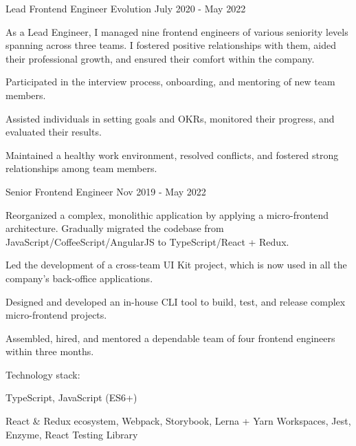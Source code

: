 \begin{cventries}
  \cventry
    {Lead Frontend Engineer} %
    {Evolution} %
    {} %
    {July 2020 - May 2022} %
    {
      As a Lead Engineer, I managed nine frontend engineers of various seniority levels spanning across three teams. I fostered positive relationships with them, aided their professional growth, and ensured their comfort within the company.
      \newline
      \vspace{6mm}
      \begin{cvitems}
        \item Participated in the interview process, onboarding, and mentoring of new team members.
        \item Assisted individuals in setting goals and OKRs, monitored their progress, and evaluated their results.
        \item Maintained a healthy work environment, resolved conflicts, and fostered strong relationships among team members.
      \end{cvitems}
    }

  \cventry
    {Senior Frontend Engineer} %
    {} %
    {} %
    {Nov 2019 - May 2022} %
    {
      \begin{cvitems} 
        \item Reorganized a complex, monolithic application by applying a micro-frontend architecture. Gradually migrated the codebase from JavaScript/CoffeeScript/AngularJS to TypeScript/React + Redux.
        \item Led the development of a cross-team UI Kit project, which is now used in all the company’s back-office applications.
        \item Designed and developed an in-house CLI tool to build, test, and release complex micro-frontend projects.
        \item Assembled, hired, and mentored a dependable team of four frontend engineers within three months.
      \end{cvitems}
      \vspace{5mm}
      Technology stack:
      \begin{cvstackitems}
        \item TypeScript, JavaScript (ES6+)
        \item React \& Redux ecosystem, Webpack, Storybook, Lerna + Yarn Workspaces, Jest, Enzyme, React Testing Library
      \end{cvstackitems}
      \vspace{-2.0mm}
    }


\end{cventries}
